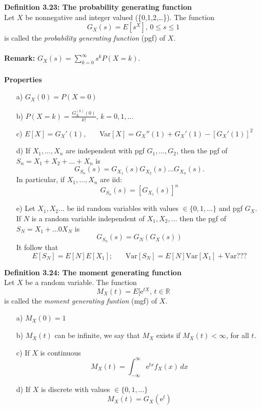 \documentclass[12pt,a4paper,draft]{report}
\author{Frederik Appel Vardinghus-Nielsen}
\begin{document}
\noindent \textbf{Definition 3.23: The probability generating function}\\
Let $X$ be nonnegative and integer valued (\{0,1,2,\ldots\}). The function
\begin{equation}
G_X(s)=E[s^X],\,0\leq s\leq 1
\end{equation}
is called the \textit{probability generating function} (pgf) of $X$.\\\\
\textbf{Remark:} $G_X(s)=\sum_{k=0}^{\infty}s^kP(X=k)$.\\\\
\textbf{Properties}
\begin{itemize}
\setlength\itemsep{0em}
\item[a)] $G_X(0)=P(X=0)$
\item[b)] $P(X=k)=\frac{G_X^{(k)}(0)}{k!},\,k=0,1,\ldots$
\item[c)] $E[X]=G_X'(1),\phantom{mm}$Var$[X]=G_X''(1)+G_X'(1)-[G_X'(1)]^2$
\item[d)] If $X_1,\ldots,X_n$ are independent with pgf $G_1,\ldots,G_2$, then the pgf of $S_n=X_1+X_2+\ldots+X_n$ is
\begin{equation}
G_{S_n}(s)=G_{X_1}(s)G_{X_2}(s)\ldots G_{X_n}(s).
\end{equation}
In particular, if $X_1,\ldots,X_n$ are iid:
\begin{equation}
G_{S_n}(s)=[G_{X_1}(s)]^n
\end{equation}
\item[e)] Let $X_1,X_2\ldots$ be iid random variables with values $\in\{0,1,\ldots\}$ and pgf $G_X$. If $N$ is a random variable independent of $X_1,X_2,\ldots$ then the pgf of $S_N=X_1+\ldots0X_N$ is
\begin{equation}
G_{S_n}(s)=G_N(G_X(s))
\end{equation}
It follow that
\begin{equation}
E[S_N]=E[N]E[X_1];\phantom{mm}\text{Var}[S_N]=E[N]\text{Var}[X_1]+\text{Var}\text{???}
\end{equation}
\end{itemize}
\textbf{Definition 3.24: The moment generating function}\\
Let $X$ be a random variable. The function
\begin{equation}
M_X(t)=E[\mathrm{e}^{tX},\,t\in\mathbb{R}
\end{equation}
is called the \textit{moment generating funtion} (mgf) of $X$.\\
\begin{itemize}
\setlength\itemsep{0em}
\item[a)] $M_X(0)=1$
\item[b)] $M_X(t)$ can be infinite, we say that $M_X$ exists if $M_X(t)<\infty$, for all $t$.
\item[c)] If $X$ is continuous
\begin{equation}
M_X(t)=\int_{-\infty}^{\infty}\!\mathrm{e}^{tx}f_X(x)\,dx
\end{equation}
\item[d)] If $X$ is discrete with values $\in\{0,1,\ldots\}$
\begin{equation}
M_X(t)=G_X(\mathrm{e}^t)
\end{equation}
\end{itemize}
\end{document}
